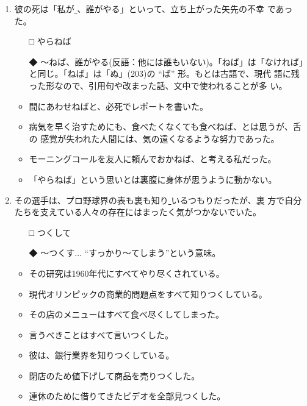\documentclass[
uplatex,
b5paper,
10pt,
dvipdfmx
]{jsbook}
\begin{document}
\begin{enumerate}
\item 彼の死は「私が\underline{   }、誰がやる」といって、立ち上がった矢先の不幸
      であった。

\begin{itemize}
\item[□] やらねば
\item[◆] 〜ねば、誰がやる(反語：他には誰もいない)。「ねば」は「なければ」
	  と同じ。「ねば」は「ぬ」(203)の ``ば'' 形。もとは古語で、現代
	  語に残った形なので、引用句や改まった話、文中で使われることが多
	  い。
\end{itemize}

\begin{itemize}
\item 間にあわせねばと、必死でレポートを書いた。
\item 病気を早く治すためにも、食べたくなくても食べねば、とは思うが、舌の
      感覚が失われた人間には、気の遠くなるような努力であった。
\item モーニングコールを友人に頼んでおかねば、と考える私だった。
\item 「やらねば」という思いとは裏腹に身体が思うように動かない。
\end{itemize}

\item その選手は、プロ野球界の表も裏も知り\underline{   }いるつもりだったが、裏
      方で自分たちを支えている人々の存在にはまったく気がつかないでいた。

\begin{itemize}
\item[□] つくして
\item[◆] 〜つくす... ``すっかり〜てしまう''という意味。
\end{itemize}

\begin{itemize}
\item その研究は1960年代にすべてやり尽くされている。
\item 現代オリンピックの商業的問題点をすべて知りつくしている。
\item その店のメニューはすべて食べ尽くしてしまった。
\item 言うべきことはすべて言いつくした。
\item 彼は、銀行業界を知りつくしている。
\item 閉店のため値下げして商品を売りつくした。
\item 連休のために借りてきたビデオを全部見つくした。
\end{itemize}


\end{enumerate}
\end{document}
